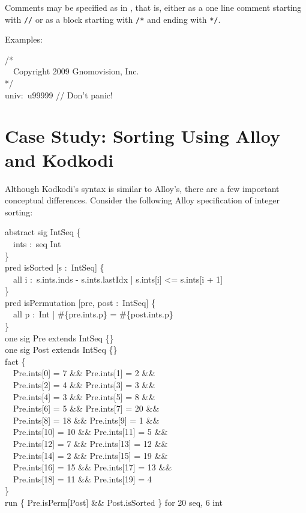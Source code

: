 \documentclass[a4paper,12pt]{article}
\begin{document}
Comments may be specified as in \cpp, that is, either as a one line comment
starting with \verb|//| or as a block starting with \verb|/*| and ending with
\verb|*/|.

Examples:

\pre
\ttfamily\small
/* \\
~~Copyright 2009 Gnomovision, Inc. \\
*/ \\[2\smallskipamount]
univ:~u99999  // Don't panic!
\post

\section{Case Study: Sorting Using Alloy and Kodkodi}
\label{case-study-sorting-using-alloy-and-kodkodi}

Although Kodkodi's syntax is similar to Alloy's, there are a few important
conceptual differences. Consider the following Alloy specification of integer
sorting:

\pre
\ttfamily\small
abstract sig IntSeq \{ \\
~~ints :~seq Int \\
\} \\[2\smallskipamount]
pred isSorted [s :~IntSeq] \{ \\
~~all i :~s.ints.inds - s.ints.lastIdx | s.ints[i] <= s.ints[i + 1] \\
\} \\
pred isPermutation [pre, post :~IntSeq] \{ \\
~~all p :~Int | \#\{pre.ints.p\} = \#\{post.ints.p\} \\
\} \\[2\smallskipamount]
one sig Pre extends IntSeq \{\} \\
one sig Post extends IntSeq \{\} \\[2\smallskipamount]
fact \{ \\
~~Pre.ints[0] = 7 \&\& Pre.ints[1] = 2 \&\& \\
~~Pre.ints[2] = 4 \&\& Pre.ints[3] = 3 \&\& \\
~~Pre.ints[4] = 3 \&\& Pre.ints[5] = 8 \&\& \\
~~Pre.ints[6] = 5 \&\& Pre.ints[7] = 20 \&\& \\
~~Pre.ints[8] = 18 \&\& Pre.ints[9] = 1 \&\& \\
~~Pre.ints[10] = 10 \&\& Pre.ints[11] = 5 \&\& \\
~~Pre.ints[12] = 7 \&\& Pre.ints[13] = 12 \&\& \\
~~Pre.ints[14] = 2 \&\& Pre.ints[15] = 19 \&\& \\
~~Pre.ints[16] = 15 \&\& Pre.ints[17] = 13 \&\& \\
~~Pre.ints[18] = 11 \&\& Pre.ints[19] = 4 \\
\} \\[2\smallskipamount]
run \{ Pre.isPerm[Post] \&\& Post.isSorted \} for 20 seq, 6 int
\post
\end{document}
